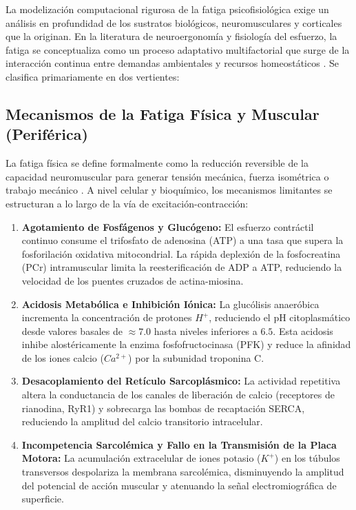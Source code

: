 La modelización computacional rigurosa de la fatiga psicofisiológica exige un análisis en profundidad de los sustratos biológicos, neuromusculares y corticales que la originan. En la literatura de neuroergonomía y fisiología del esfuerzo, la fatiga se conceptualiza como un proceso adaptativo multifactorial que surge de la interacción continua entre demandas ambientales y recursos homeostáticos \cite{enoka2008muscle, grandjean1979fatigue, boksem2005effects}. Se clasifica primariamente en dos vertientes:

\subsection{Mecanismos de la Fatiga Física y Muscular (Periférica)}

La fatiga física se define formalmente como la reducción reversible de la capacidad neuromuscular para generar tensión mecánica, fuerza isométrica o trabajo mecánico \cite{enoka2008muscle}. A nivel celular y bioquímico, los mecanismos limitantes se estructuran a lo largo de la vía de excitación-contracción:

\begin{enumerate}
    \item \textbf{Agotamiento de Fosfágenos y Glucógeno:} El esfuerzo contráctil continuo consume el trifosfato de adenosina (ATP) a una tasa que supera la fosforilación oxidativa mitocondrial. La rápida deplexión de la fosfocreatina (PCr) intramuscular limita la reesterificación de ADP a ATP, reduciendo la velocidad de los puentes cruzados de actina-miosina.
    \item \textbf{Acidosis Metabólica e Inhibición Iónica:} La glucólisis anaeróbica incrementa la concentración de protones $H^+$, reduciendo el pH citoplasmático desde valores basales de $\approx 7.0$ hasta niveles inferiores a $6.5$. Esta acidosis inhibe alostéricamente la enzima fosfofructocinasa (PFK) y reduce la afinidad de los iones calcio ($Ca^{2+}$) por la subunidad troponina C.
    \item \textbf{Desacoplamiento del Retículo Sarcoplásmico:} La actividad repetitiva altera la conductancia de los canales de liberación de calcio (receptores de rianodina, RyR1) y sobrecarga las bombas de recaptación SERCA, reduciendo la amplitud del calcio transitorio intracelular.
    \item \textbf{Incompetencia Sarcolémica y Fallo en la Transmisión de la Placa Motora:} La acumulación extracelular de iones potasio ($K^+$) en los túbulos transversos despolariza la membrana sarcolémica, disminuyendo la amplitud del potencial de acción muscular y atenuando la señal electromiográfica de superficie.
\end{enumerate}

